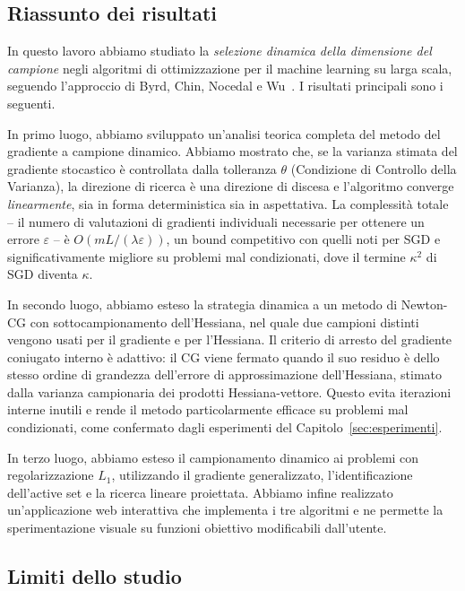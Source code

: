\documentclass[a4paper,12pt]{article}
\numberwithin{equation}{section}
\numberwithin{figure}{section}
\numberwithin{table}{section}
\begin{document}
\subsection{Riassunto dei risultati}

In questo lavoro abbiamo studiato la \emph{selezione dinamica della dimensione
del campione} negli algoritmi di ottimizzazione per il machine learning su
larga scala, seguendo l'approccio di Byrd, Chin, Nocedal e Wu~\cite{byrd2012}.
I risultati principali sono i seguenti.

In primo luogo, abbiamo sviluppato un'analisi teorica completa del metodo del
gradiente a campione dinamico. Abbiamo mostrato che, se la varianza stimata
del gradiente stocastico è controllata dalla tolleranza $\theta$ (Condizione di
Controllo della Varianza), la direzione di ricerca è una direzione di discesa e
l'algoritmo converge \emph{linearmente}, sia in forma deterministica sia in
aspettativa. La complessità totale -- il numero di valutazioni di gradienti
individuali necessarie per ottenere un errore $\varepsilon$ -- è
$O(m L/(\lambda\varepsilon))$, un bound competitivo con quelli noti per SGD e
significativamente migliore su problemi mal condizionati, dove il termine
$\kappa^2$ di SGD diventa $\kappa$.

In secondo luogo, abbiamo esteso la strategia dinamica a un metodo di
Newton-CG con sottocampionamento dell'Hessiana, nel quale due campioni distinti
vengono usati per il gradiente e per l'Hessiana. Il criterio di arresto del
gradiente coniugato interno è adattivo: il CG viene fermato quando il suo
residuo è dello stesso ordine di grandezza dell'errore di approssimazione
dell'Hessiana, stimato dalla varianza campionaria dei prodotti
Hessiana-vettore. Questo evita iterazioni interne inutili e rende il metodo
particolarmente efficace su problemi mal condizionati, come confermato dagli
esperimenti del Capitolo~\ref{sec:esperimenti}.

In terzo luogo, abbiamo esteso il campionamento dinamico ai problemi con
regolarizzazione $L_1$, utilizzando il gradiente generalizzato, l'identificazione
dell'active set e la ricerca lineare proiettata. Abbiamo infine realizzato
un'applicazione web interattiva che implementa i tre algoritmi e ne permette la
sperimentazione visuale su funzioni obiettivo modificabili dall'utente.

\subsection{Limiti dello studio}
\end{document}

